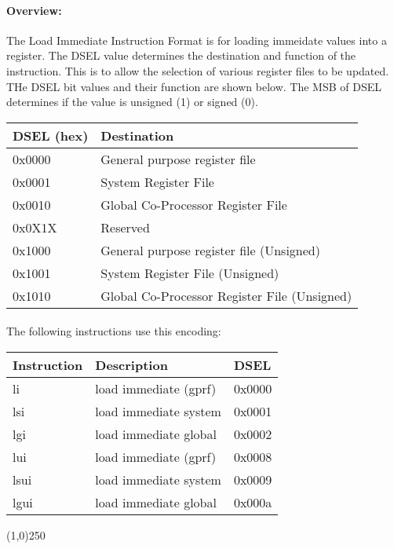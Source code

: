 \documentclass[letterpaper, 11pt]{article}
\begin{document}
\paragraph{Overview:}The Load Immediate Instruction Format is for loading immeidate values into a register.
The DSEL value determines the destination and function of the instruction. This is to allow the selection
of various register files to be updated. THe DSEL bit values and their function are shown below. 
The MSB of DSEL determines if the value is unsigned (1) or signed (0). \\
\begin{tabular}{l|l}
		DSEL (hex) & Destination \\ \hline
		0x0000 & General purpose register file \\
		0x0001 & System Register File \\
		0x0010 & Global Co-Processor Register File \\ 
		0x0X1X & Reserved \\
		0x1000 & General purpose register file  (Unsigned)\\
		0x1001 & System Register File (Unsigned)\\
		0x1010 & Global Co-Processor Register File (Unsigned)\\ 
		
		\end{tabular}

\paragraph{}The following instructions use this encoding: \\
\begin{center}
	\begin{tabular}{|l|l|l|} \hline
			Instruction & Description 						& DSEL\\ \hline
			li			& load immediate (gprf)				& 0x0000 \\ \hline
			lsi			& load immediate system				& 0x0001 \\ \hline
			lgi			& load immediate global				& 0x0002 \\ \hline
 			lui			& load immediate (gprf)				& 0x0008 \\ \hline
			lsui		& load immediate system				& 0x0009 \\ \hline
			lgui		& load immediate global				& 0x000a \\ \hline 

\end{tabular}
\end{center}
\begin{center}
	\line(1,0){250}
\end{center}
\end{document}
